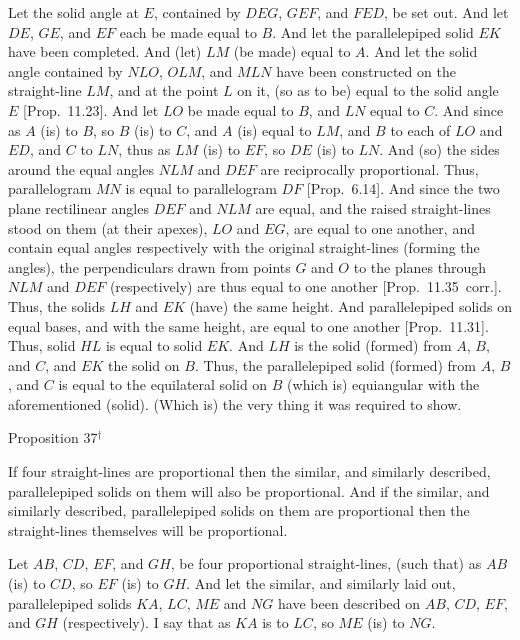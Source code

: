 Let the solid angle at $E$, contained by $DEG$, $GEF$, and
$FED$, be set out. And let $DE$, $GE$, and $EF$ each be made equal
to $B$. And let the parallelepiped solid $EK$ have been completed.
And (let) $LM$ (be made) equal to $A$. And let the solid angle
contained by $NLO$, $OLM$, and $MLN$ have been constructed
on the straight-line $LM$, and at the point $L$ on it, (so as to be)
equal to the solid angle $E$ [Prop.~11.23]. 
And let $LO$ be made equal to $B$, and $LN$ equal  to $C$. And
since as $A$ (is) to $B$, so $B$ (is) to $C$, and $A$ (is) equal to
$LM$, and $B$ to each of $LO$ and $ED$, and $C$ to $LN$,
thus as $LM$ (is) to $EF$, so $DE$ (is) to $LN$. And (so) the sides
around the equal angles $NLM$ and $DEF$ are reciprocally
proportional. Thus, parallelogram $MN$ is equal to parallelogram
$DF$ [Prop.~6.14]. And since the
two plane rectilinear angles $DEF$ and $NLM$ are equal, and the raised straight-lines
stood on them (at their apexes), $LO$ and $EG$, are equal to one another,
and contain equal angles respectively with the original straight-lines (forming the angles),  the perpendiculars drawn from points $G$ and $O$
to the planes through $NLM$ and $DEF$ (respectively) are thus
equal to one another [Prop.~11.35~corr.]. 
Thus, the solids $LH$ and $EK$ (have) the same height. And
parallelepiped solids on equal bases, and with the same height, are
equal to one another [Prop.~11.31]. Thus,
solid $HL$ is equal to solid $EK$. And $LH$ is the solid (formed)
from $A$, $B$, and $C$, and $EK$ the solid on $B$. Thus,
the parallelepiped solid (formed) from $A$, $B$, and $C$ is equal
to the equilateral solid on $B$ (which is) equiangular with the
aforementioned (solid). (Which is) the very thing it was required to show.


\begin{center}
{\large Proposition 37}$^\dag$
\end{center}

If four straight-lines are  proportional then the  similar, and similarly described, parallelepiped solids on them will
also be proportional. And if the similar, and similarly
described, parallelepiped solids on them are proportional
then the straight-lines themselves will be  proportional.\\

\epsfysize=1.9in
\centerline{}

Let $AB$, $CD$, $EF$, and $GH$, be four proportional
straight-lines, (such that) as $AB$ (is) to $CD$, so $EF$ (is) to $GH$. 
And let the similar, and similarly laid out, parallelepiped solids $KA$,
$LC$, $ME$ and $NG$ have been described on $AB$, $CD$,
$EF$, and $GH$ (respectively). I say that as $KA$ is to $LC$, so
$ME$ (is) to $NG$.

